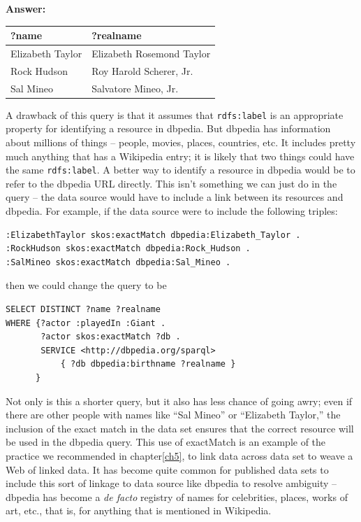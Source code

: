 \textbf{\textbf{Answer:}}

\begin{tabular}{|ll|}
\hline
?name&?realname\\
\hline
Elizabeth Taylor&Elizabeth Rosemond Taylor\\
Rock Hudson&Roy Harold Scherer, Jr.\\
Sal Mineo&Salvatore Mineo, Jr.\\
\hline
\end{tabular}

A drawback of this query is that it assumes that \texttt{rdfs:label} is an
appropriate property for identifying a resource in dbpedia. But dbpedia
has information about millions of things -- people, movies, places,
countries, etc. It includes pretty much anything that has a Wikipedia
entry; it is likely that two things could have the same \texttt{rdfs:label}. A
better way to identify a resource in dbpedia would be to refer to the
dbpedia URL directly. This isn't something we can just do in the query
-- the data source would have to include a link between its resources
and dbpedia. For example, if the data source were to include the
following triples:

\begin{lstlisting}
:ElizabethTaylor skos:exactMatch dbpedia:Elizabeth_Taylor .
:RockHudson skos:exactMatch dbpedia:Rock_Hudson .
:SalMineo skos:exactMatch dbpedia:Sal_Mineo .
\end{lstlisting}

then we could change the query to be 

\begin{lstlisting}
SELECT DISTINCT ?name ?realname
WHERE {?actor :playedIn :Giant .
       ?actor skos:exactMatch ?db .
       SERVICE <http://dbpedia.org/sparql>
           { ?db dbpedia:birthname ?realname }
      }
\end{lstlisting}

Not only is this a shorter query, but it also has less chance of going
awry; even if there are other people with names like ``Sal Mineo'' or
``Elizabeth Taylor,'' the inclusion of the exact match in the data set
ensures that the correct resource will be used in the dbpedia query.
This use of exactMatch is an example of the practice we recommended in
chapter\ref{ch5}, to link data across data set to weave a Web of linked data.
It has become quite common for published data sets to include this sort
of linkage to data source like dbpedia to resolve ambiguity -- dbpedia
has become a \emph{de facto} registry of names for celebrities, places,
works of art, etc., that is, for anything that is mentioned in
Wikipedia.

